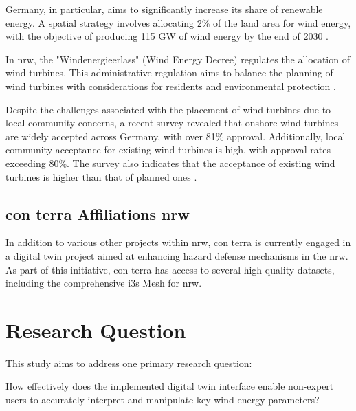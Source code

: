 \documentclass[11pt, titlepage, a4paper]{scrartcl}
\begin{document}
\begin{linenumbers}
    Germany, in particular, aims to significantly increase its share of renewable energy. A spatial strategy involves allocating 2\% of the land area for wind energy, with the objective of producing 115 GW of wind energy by the end of 2030 \cite{WindenergieLand}.


    In \gls{nrw}, the "Windenergieerlass" (Wind Energy Decree) \cite{nrwErlassFurPlanung} regulates the allocation of wind turbines. This administrative regulation aims to balance the planning of wind turbines with considerations for residents and environmental protection \cite{nrwErlassFurPlanung}.

    Despite the challenges associated with the placement of wind turbines due to local community concerns, a recent survey revealed that onshore wind turbines are widely accepted across Germany, with over 81\% approval. Additionally, local community acceptance for existing wind turbines is high, with approval rates exceeding 80\%. The survey also indicates that the acceptance of existing wind turbines is higher than that of planned ones \cite{fachagenturwindenergieanlandUmfrageZurAkzeptanz}.

    \subsection{con terra Affiliations \gls{nrw}}
    In addition to various other projects within \gls{nrw}, con terra is currently engaged in a digital twin project aimed at enhancing hazard defense mechanisms in the \gls{nrw}. As part of this initiative, con terra has access to several high-quality datasets, including the comprehensive \gls{i3s} Mesh for \gls{nrw}.


    \section{Research Question}

    This study aims to address one primary research question:

    \begin{questions}
        \item \label{rq:first_q} How effectively does the implemented digital twin interface enable non-expert users to accurately interpret and manipulate key wind energy parameters?

    \end{questions}


\end{linenumbers}
\end{document}
